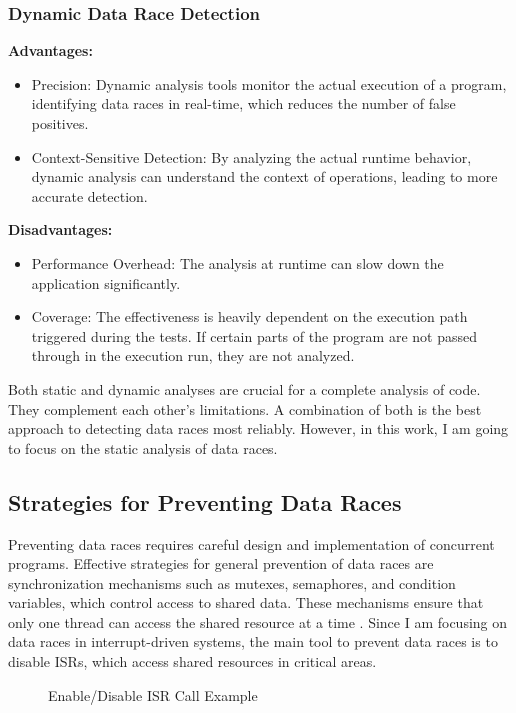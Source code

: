 \documentclass[
fancyheadings, %
%
%
]{stsreprt}
\begin{document}
{		\subsubsection{Dynamic Data Race Detection \cite{flanagan2009}}
		\textbf{Advantages:}
		\begin{itemize}
			\item Precision: Dynamic analysis tools monitor the actual execution of a program, identifying data races in real-time, which reduces the number of false positives.
			\item Context-Sensitive Detection: By analyzing the actual runtime behavior, dynamic analysis can understand the context of operations, leading to more accurate detection.
		\end{itemize}
		\textbf{Disadvantages:}
		\begin{itemize}
			\item Performance Overhead: The analysis at runtime can slow down the application significantly.
			\item Coverage: The effectiveness is heavily dependent on the execution path triggered during the tests. If certain parts of the program are not passed through in the execution run, they are not analyzed.
		\end{itemize}
		
		Both static and dynamic analyses are crucial for a complete analysis of code. They complement each other's limitations. A combination of both is the best approach to detecting data races most reliably. However, in this work, I am going to focus on the static analysis of data races.
		
		\subsection{Strategies for Preventing Data Races}
		
		Preventing data races requires careful design and implementation of concurrent programs. Effective strategies for general prevention of data races are synchronization mechanisms such as mutexes, semaphores, and condition variables, which control access to shared data. These mechanisms ensure that only one thread can access the shared resource at a time \cite{herlihy2008}. Since I am focusing on data races in interrupt-driven systems, the main tool to prevent data races is to disable \acp{ISR}, which access shared resources in critical areas.
		
		
		\begin{figure}[H]
			\centering
			\begin{algorithm}[H]
				\caption{Enable/Disable \ac{ISR} Call Example}
				

\end{algorithm}
\end{figure}}
\end{document}
